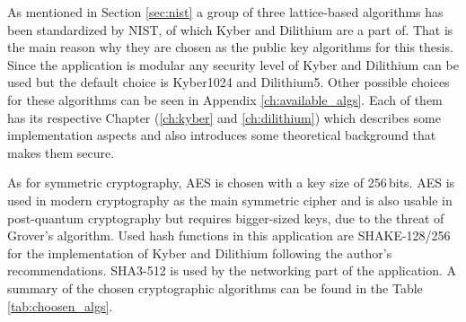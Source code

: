 As mentioned in Section \ref{sec:nist} a group of three lattice-based algorithms has been standardized by NIST, of which Kyber and Dilithium are a part of. That is the main reason why they are chosen as the public key algorithms for this thesis. Since the application is modular any security level of Kyber and Dilithium can be used but the default choice is Kyber1024 and Dilithium5. Other possible choices for these algorithms can be seen in Appendix \ref{ch:available_algs}. Each of them has its respective Chapter (\ref{ch:kyber} and \ref{ch:dilithium}) which describes some implementation aspects and also introduces some theoretical background that makes them secure.


As for symmetric cryptography, AES is chosen with a key size of 256\,bits. AES is used in modern cryptography as the main symmetric cipher and is also usable in post-quantum cryptography but requires bigger-sized keys, due to the threat of Grover's algorithm. Used hash functions in this application are SHAKE-128/256 for the implementation of Kyber and Dilithium following the author's recommendations. SHA3-512 is used by the networking part of the application. A summary of the chosen cryptographic algorithms can be found in the Table \ref{tab:choosen_algs}.
